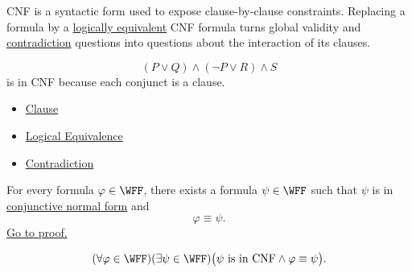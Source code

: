 \begin{remark*}[Interpretation]
CNF is a syntactic form used to expose clause-by-clause constraints. Replacing
a formula by a
\hyperref[def:logical-equivalence-propositional-logic]{logically equivalent}
CNF formula turns global validity and
\hyperref[def:contradiction-propositional-logic]{contradiction} questions into
questions about the interaction of its clauses.
\end{remark*}

\begin{example*}[Examples]
\[
(P\lor Q)\land(\neg P\lor R)\land S
\]
is in CNF because each conjunct is a clause.
\end{example*}

\begin{dependencies}
\begin{itemize}
  \item \hyperref[def:clause-propositional-logic]{Clause}
  \item \hyperref[def:logical-equivalence-propositional-logic]{Logical Equivalence}
  \item \hyperref[def:contradiction-propositional-logic]{Contradiction}
\end{itemize}
\end{dependencies}

\begin{tcolorbox}[colback=thmbox, colframe=thmborder, arc=2pt, left=6pt, right=6pt, top=4pt, bottom=4pt, title={\small\textbf{Theorem (Existence of Conjunctive Normal Form)}}]
\begin{theorem}
\label{thm:existence-conjunctive-normal-form-propositional-logic}
For every formula \(\varphi\in\WFF\), there exists a formula
\(\psi\in\WFF\) such that \(\psi\) is in
\hyperref[def:conjunctive-normal-form-propositional-logic]{conjunctive normal form}
and
\[
\varphi\equiv\psi.
\]
\noindent\hyperref[prf:existence-conjunctive-normal-form-propositional-logic]{Go to proof.}
\end{theorem}
\end{tcolorbox}

\begin{remark*}
\[
(\forall\varphi\in\WFF)(\exists\psi\in\WFF)
\bigl(\psi\text{ is in CNF}\land \varphi\equiv\psi\bigr).
\]
\end{remark*}

